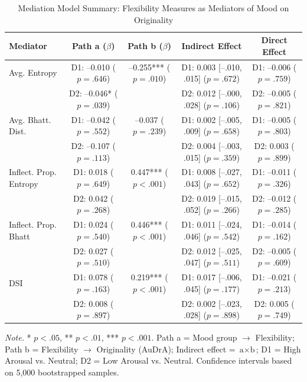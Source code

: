 \documentclass[../MA_Thesis.tex]{subfiles}
\begin{document}
\begin{appendix}
\begin{table}[H]
{\fontsize{9pt}{11pt}\selectfont
\centering
\caption{Mediation Model Summary: Flexibility Measures as Mediators of Mood on Originality}
\label{tab:mediation_summary}
\begin{tabular}{lcccc}
\toprule
\textbf{Mediator} & \textbf{Path a} ($\beta$) & \textbf{Path b} ($\beta$) & \textbf{Indirect Effect} & \textbf{Direct Effect} \\
\midrule
Avg. Entropy & D1: –0.010 ($p = .646$) & –0.255*** ($p = .010$) & D1: 0.003 [–.010, .015] ($p = .672$) & D1: –0.006 ($p = .759$) \\
             & D2: –0.046* ($p = .039$) &                         & D2: 0.012 [–.000, .028] ($p = .106$) & D2: –0.005 ($p = .821$) \\
\addlinespace
Avg. Bhatt. Dist. & D1: –0.042 ($p = .552$) & –0.037 ($p = .239$) & D1: 0.002 [–.005, .009] ($p = .658$) & D1: –0.005 ($p = .803$) \\
                  & D2: –0.107 ($p = .113$) &                     & D2: 0.004 [–.003, .015] ($p = .359$) & D2:  0.003 ($p = .899$) \\
\addlinespace
Inflect. Prop. Entropy & D1:  0.018 ($p = .649$) &  0.447*** ($p < .001$) & D1: 0.008 [–.027, .043] ($p = .652$) & D1: –0.011 ($p = .326$) \\
                       & D2:  0.042 ($p = .268$) &                         & D2: 0.019 [–.015, .052] ($p = .266$) & D2: –0.012 ($p = .285$) \\
\addlinespace
Inflect. Prop. Bhatt & D1:  0.024 ($p = .540$) &  0.446*** ($p < .001$) & D1: 0.011 [–.024, .046] ($p = .542$) & D1: –0.014 ($p = .162$) \\
                     & D2:  0.027 ($p = .510$) &                        & D2: 0.012 [–.025, .047] ($p = .511$) & D2: –0.005 ($p = .609$) \\
\addlinespace
DSI & D1: 0.078 ($p = .163$) & 0.219*** ($p < .001$) & D1: 0.017 [–.006, .045] ($p = .177$) & D1: –0.021 ($p = .213$) \\
    & D2: 0.008 ($p = .897$) &                        & D2: 0.002 [–.023, .028] ($p = .898$) & D2:  0.005 ($p = .749$) \\
\bottomrule
\end{tabular}
\begin{tablenotes}[flushleft]
\small
\item \textit{Note.} * $p < .05$, ** $p < .01$, *** $p < .001$. Path a = Mood group $\rightarrow$ Flexibility; Path b = Flexibility $\rightarrow$ Originality (AuDrA); Indirect effect = $\text{a} \times \text{b}$; D1 = High Arousal vs. Neutral; D2 = Low Arousal vs. Neutral. Confidence intervals based on 5,000 bootstrapped samples.
\end{tablenotes}
}
\end{table}

\end{appendix}
\end{document}

